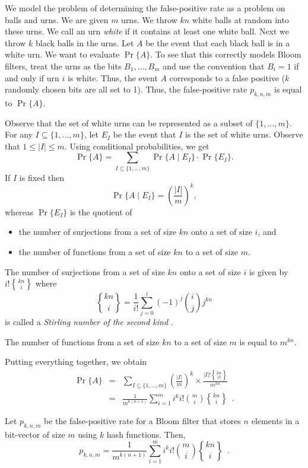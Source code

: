 \documentclass[lotsofwhite]{patmorin}
\newcommand{\stirling}[2]{\genfrac{\{}{\}}{0pt}{}{#1}{#2}}
\begin{document}
We model the problem of determining the false-positive rate as a
problem on balls and urns.  We are given $m$ urns. We throw $kn$
white balls at random into these urns.  We call an urn \emph{white}
if it contains at least one white ball.  Next we throw $k$ black balls
in the urns.  Let $A$ be the event that each black ball is in a white
urn.  We want to evaluate $\Pr\{A\}$.  To see that this correctly
models Bloom filters, treat the urns as the bits $B_1,\ldots,B_m$ and
use the convention that $B_i=1$ if and only if urn $i$ is white.
Thus, the event $A$ corresponds to a false positive ($k$ randomly
chosen bits are all set to 1).  Thus, the false-positive rate
$p_{k,n,m}$ is equal to $\Pr\{A\}$.

Observe that the set of white urns can be represented as a subset of
$\{ 1,\ldots,m \}$.  For any $I \subseteq \{ 1,\ldots,m \}$, let
$E_I$ be the event that $I$ is the set of white urns. Observe that $1
\leq |I| \leq m$. Using conditional probabilities, we get 
\[ \Pr\{A\} = \sum_{I \subseteq \{ 1,\ldots,m \}} 
            \Pr\{ A \mid E_I \} \cdot \Pr\{ E_I \}. 
\] 
If $I$ is fixed then 
\[ \Pr\{ A \mid E_I \} = \left(\frac{|I|}{m}\right)^k ,
\] 
whereas $\Pr\{ E_I \}$ is the quotient of 
\begin{itemize} 
\item the number of surjections from a set of size $kn$ onto a set of
size $i$, and
\item the number of functions from a set of size $kn$ to a set of size
$m$.
\end{itemize} 


The number of surjections from a set of size $kn$ onto a set of size
$i$ is given by $i!\stirling{kn}{i}$ where 
\[ 
 \stirling{kn}{i} = 
     \frac{1}{i!}\sum_{j=0}^i (-1)^j \binom{i}{j} j^{kn} 
\] is called a
\emph{Stirling number of the second kind} \cite[Section~6.1]{gkp94}.
 
The number of functions from a set of size $kn$ to a set of size $m$
is equal to $m^{kn}$. 

Putting everything together, we obtain 
\begin{eqnarray*} 
 \Pr\{ A \} & = & \sum_{I \subseteq \{ 1,\ldots,m \}}
              \left(\frac{|I|}{m}\right)^k \times
              \frac{|I|!\stirling{kn}{|I|}}{m^{kn}} \\
  & = & \frac{1}{m^{k(n+1)}}\sum_{i=1}^{m} 
           i^ki!\binom{m}{i}
          \stirling{kn}{i} \enspace .
\end{eqnarray*} 

\begin{thm}
Let $p_{k,n,m}$ be the false-positive rate for a Bloom filter that stores $n$
elements in a bit-vector of size $m$ using $k$ hash functions.  Then,
\[
  p_{k,n,m} = \frac{1}{m^{k(n+1)}}\sum_{i=1}^{m} 
           i^ki!\binom{m}{i}
          \stirling{kn}{i} \enspace .
\]
\end{thm}
\end{document}
